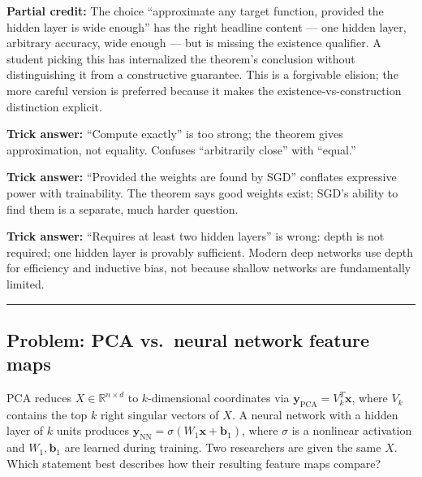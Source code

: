 \documentclass[12pt]{amsart}
\newcommand{\divider}{
  \vspace{-1em}
  \noindent
  \raisebox{-0.15ex}{\textbullet}%
  \hspace{0.5em}%
  \rule[0.5ex]{0.95\textwidth}{1.0pt}%
  \hspace{0.5em}%
  \raisebox{-0.15ex}{\textbullet}%
  \vspace{0em}
}
\begin{document}
\textbf{Partial credit:}
The choice ``approximate any target function, provided the hidden layer is
wide enough'' has the right headline content --- one hidden layer, arbitrary
accuracy, wide enough --- but is missing the existence qualifier. A student
picking this has internalized the theorem's conclusion without distinguishing
it from a constructive guarantee. This is a forgivable elision; the more
careful version is preferred because it makes the existence-vs-construction
distinction explicit.

\textbf{Trick answer:}
``Compute exactly'' is too strong; the theorem gives approximation, not
equality. Confuses ``arbitrarily close'' with ``equal.''

\textbf{Trick answer:}
``Provided the weights are found by SGD'' conflates expressive power with
trainability. The theorem says good weights exist; SGD's ability to find
them is a separate, much harder question.

\textbf{Trick answer:}
``Requires at least two hidden layers'' is wrong: depth is not required;
one hidden layer is provably sufficient. Modern deep networks use depth
for efficiency and inductive bias, not because shallow networks are
fundamentally limited.

\divider

\subsection*{Problem: PCA vs.\ neural network feature maps}

PCA reduces $X \in \mathbb{R}^{n \times d}$ to $k$-dimensional coordinates
via $\mathbf{y}_{\text{PCA}} = V_k^T \mathbf{x}$, where $V_k$ contains the top
$k$ right singular vectors of $X$. A neural network with a hidden layer of
$k$ units produces $\mathbf{y}_{\text{NN}} = \sigma(W_1 \mathbf{x} + \mathbf{b}_1)$,
where $\sigma$ is a nonlinear activation and $W_1, \mathbf{b}_1$ are learned
during training. Two researchers are given the same $X$. Which statement
best describes how their resulting feature maps compare?
\end{document}
